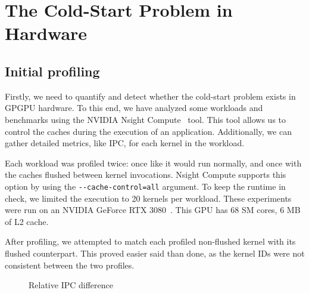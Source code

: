 \chapter{The Cold-Start Problem in Hardware}\label{ch:hw-analysis}

\section{Initial profiling}\label{sec:initial-profiling}
Firstly, we need to quantify and detect whether the cold-start problem exists in GPGPU hardware.
To this end, we have analyzed some workloads and benchmarks using the NVIDIA Nsight Compute~\cite{nsight} tool.
This tool allows us to control the caches during the execution of an application.
Additionally, we can gather detailed metrics, like IPC, for each kernel in the workload.

Each workload was profiled twice: once like it would run normally, and once with the caches flushed between kernel invocations.
Nsight Compute supports this option by using the \verb|--cache-control=all| argument.
To keep the runtime in check, we limited the execution to 20 kernels per workload.
These experiments were run on an NVIDIA GeForce RTX 3080~\cite{nvidia-wp}.
This GPU has 68 SM cores, 6 MB of L2 cache.

After profiling, we attempted to match each profiled non-flushed kernel with its flushed counterpart.
This proved easier said than done, as the kernel IDs were not consistent between the two profiles.

\begin{figure}
    \centering
    \caption{Relative IPC difference}
    \label{fig:ipc_diff}
\end{figure}


